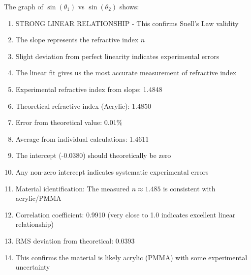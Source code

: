 \documentclass[12pt, a4paper]{article}
\begin{document}
The graph of $\sin(\theta_1)$ vs $\sin(\theta_2)$ shows:
\begin{enumerate}
\item STRONG LINEAR RELATIONSHIP - This confirms Snell's Law validity
\item The slope represents the refractive index $n$
\item Slight deviation from perfect linearity indicates experimental errors
\item The linear fit gives us the most accurate measurement of refractive index
\item Experimental refractive index from slope: 1.4848
\item Theoretical refractive index (Acrylic): 1.4850
\item Error from theoretical value: 0.01\%
\item Average from individual calculations: 1.4611
\item The intercept (-0.0380) should theoretically be zero
\item Any non-zero intercept indicates systematic experimental errors
\item Material identification: The measured $n\approx 1.485$ is consistent with acrylic/PMMA
\item Correlation coefficient: 0.9910 (very close to 1.0 indicates excellent linear relationship)
\item RMS deviation from theoretical: 0.0393
\item This confirms the material is likely acrylic (PMMA) with some experimental uncertainty
\end{enumerate}
\end{document}
